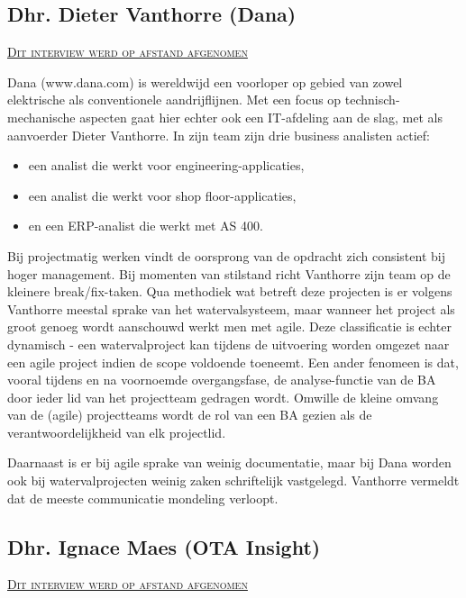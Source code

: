 \documentclass{hogent-article}
\begin{document}
\subsection{Dhr. Dieter Vanthorre (Dana)}
\textsc{\underline{Dit interview werd op afstand afgenomen}}

\vspace{5pt}

Dana (www.dana.com) is wereldwijd een voorloper op gebied van zowel elektrische als conventionele aandrijflijnen.
Met een focus op technisch-mechanische aspecten gaat hier echter ook een IT-afdeling aan de slag, met als aanvoerder Dieter Vanthorre.
In zijn team zijn drie business analisten actief: 

\begin{itemize}
  \item een analist die werkt voor engineering-applicaties,
  \item een analist die werkt voor shop floor-applicaties,
  \item en een ERP-analist die werkt met AS 400.
\end{itemize}
Bij projectmatig werken vindt de oorsprong van de opdracht zich consistent bij hoger management. Bij momenten van stilstand
richt Vanthorre zijn team op de kleinere break/fix-taken. Qua methodiek wat betreft deze projecten is er volgens Vanthorre
meestal sprake van het watervalsysteem, maar wanneer het project als groot genoeg wordt aanschouwd werkt men met agile.
Deze classificatie is echter dynamisch - een watervalproject kan tijdens de uitvoering worden omgezet naar een agile project
indien de scope voldoende toeneemt. Een ander fenomeen is dat, vooral tijdens en na voornoemde overgangsfase, de analyse-functie van de BA
door ieder lid van het projectteam gedragen wordt. Omwille de kleine omvang van de (agile) projectteams wordt de rol van een BA 
gezien als de verantwoordelijkheid van elk projectlid.

Daarnaast is er bij agile sprake van weinig documentatie, maar bij Dana worden ook bij watervalprojecten weinig zaken schriftelijk 
vastgelegd. Vanthorre vermeldt dat de meeste communicatie mondeling verloopt.

\subsection{Dhr. Ignace Maes (OTA Insight)}
\textsc{\underline{Dit interview werd op afstand afgenomen}}

\vspace{5pt}
\end{document}
